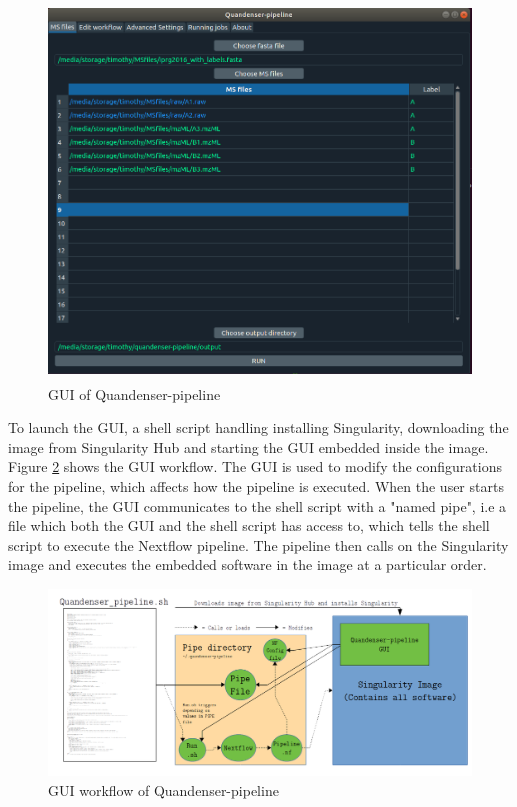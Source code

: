 \begin{figure}[H]
  \begin{center}
  \includegraphics[height=10cm]{pictures/gui.png}
  \caption{GUI of Quandenser-pipeline}
  \label{fig:GUI}
  \end{center}
\end{figure}

To launch the GUI, a shell script handling installing Singularity, downloading the image from Singularity Hub and starting the GUI embedded inside the image. Figure \ref{fig:GUI_workflow} shows the GUI workflow. The GUI is used to modify the configurations for the pipeline, which affects how the pipeline is executed. When the user starts the pipeline, the GUI communicates to the shell script with a "named pipe", i.e a file which both the GUI and the shell script has access to, which tells the shell script to execute the Nextflow pipeline. The pipeline then calls on the Singularity image and executes the embedded software in the image at a particular order.

\begin{figure}[H]
  \includegraphics[width=\linewidth]{pictures/GUI_workflow.png}
  \caption{GUI workflow of Quandenser-pipeline}
  \label{fig:GUI_workflow}
\end{figure}

